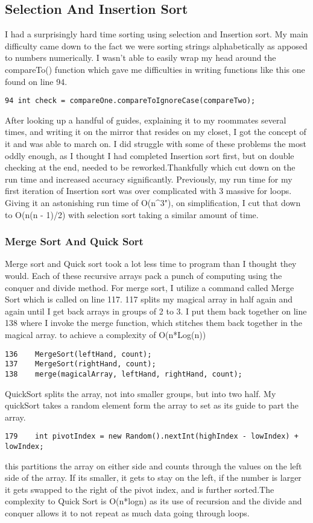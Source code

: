 \documentclass{article}
\begin{document}
\subsection{Selection And Insertion Sort}
I had a surprisingly hard time sorting using selection and Insertion sort. My main difficulty came down to the fact we were sorting strings alphabetically as apposed to numbers numerically. I wasn't able to easily wrap my head around the
compareTo() function which gave me difficulties in writing functions like this one found on line 94.
\begin{verbatim}
94 int check = compareOne.compareToIgnoreCase(compareTwo);
\end{verbatim}
After looking up a handful of guides, explaining it to my roommates several times, and writing it on the mirror that resides on my closet, I got the concept of it and was able to march on. I did struggle with some of these problems the most oddly enough, as I thought I had completed Insertion sort first, but on double checking at the end, needed to be reworked.Thankfully which cut down on the run time and increased accuracy significantly.
Previously, my run time for my first iteration of Insertion sort was over complicated with 3 massive for loops. Giving it an astonishing run time of O(n^3"), on simplification, I cut that down to O(n(n - 1)/2) with selection sort taking a similar amount of time. 


\subsubsection{Merge Sort And Quick Sort}
Merge sort and Quick sort took a lot less time to program than I thought they would. Each of these recursive arrays pack a punch of computing using the conquer and divide method. For merge sort, I utilize a command called Merge Sort which is called on line 117. 117 splits my magical array in half again and again until I get back arrays in groups of 2 to 3. I put them back together on line 138 where I invoke the merge function, which stitches them back together in the magical array. to achieve a complexity of O(n*Log(n))
\begin{verbatim}
136    MergeSort(leftHand, count);
137    MergeSort(rightHand, count);
138    merge(magicalArray, leftHand, rightHand, count);
\end{verbatim}

QuickSort splits the array, not into smaller groups, but into two half.
My quickSort takes a random element form the array to set as its guide to part the array.
\begin{verbatim}
179    int pivotIndex = new Random().nextInt(highIndex - lowIndex) + lowIndex;
\end{verbatim}
this partitions the array on either side and counts through the values on the left side of the array. If its smaller, it gets to stay on the left, if the number is larger it gets swapped to the right of the pivot index, and is further sorted.The complexity to Quick Sort is O(n*logn) as its use of recursion and the divide and conquer allows it to not repeat as much data going through loops.
\end{document}
